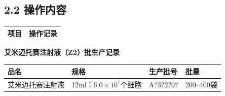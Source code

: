 \documentclass[UTF8,10pt,a4paper,fontset=fandol]{ctexart}
\newcommand{\fieldvalue}[1]{#1}
\newcommand{\handwritten}[1]{#1}
\begin{document}
\subsection*{2.2 操作内容}

\begin{tabularx}{\textwidth}{|X|X|}
\hline
项目 & 操作记录 \\
\hline
\end{tabularx}


\newpage

\begin{center}
{\Large \textbf{艾米迈托赛注射液（Z2）批生产记录}}
\end{center}

\noindent
\begin{tabularx}{\textwidth}{|X|X|X|X|}
\hline
品名 & 规格 & 生产批号 & 批量 \\
\hline
艾米迈托赛注射液 & 12ml：$6.0\times10^{7}$个细胞 &
\fieldvalue{\handwritten{A?3?2?0?}} &
200--400袋 \\
\hline
\end{tabularx}

\vspace{2mm}
\end{document}
